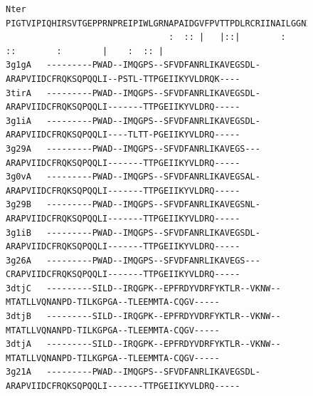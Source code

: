 \documentclass[preprint,12pt]{elsarticle}
\begin{document}
\begin{figure}
\centering
\begin{tiny}
\begin{Verbatim}[frame=single]
Nter    PIGTVIPIQHIRSVTGEPPRNPREIPIWLGRNAPAIDGVFPVTTPDLRCRIINAILGGNIGLSLTPGDCLTWDSAVATLFIRTHGTFP
                                :  :: |   |::|        :    ::        :        |    :  :: |      
3g1gA   ---------PWAD--IMQGPS--SFVDFANRLIKAVEGSDL-ARAPVIIDCFRQKSQPQQLI--PSTL-TTPGEIIKYVLDRQK----
3tirA   ---------PWAD--IMQGPS--SFVDFANRLIKAVEGSDL-ARAPVIIDCFRQKSQPQQLI-------TTPGEIIKYVLDRQ-----
3g1iA   ---------PWAD--IMQGPS--SFVDFANRLIKAVEGSDL-ARAPVIIDCFRQKSQPQQLI----TLTT-PGEIIKYVLDRQ-----
3g29A   ---------PWAD--IMQGPS--SFVDFANRLIKAVEGS---ARAPVIIDCFRQKSQPQQLI-------TTPGEIIKYVLDRQ-----
3g0vA   ---------PWAD--IMQGPS--SFVDFANRLIKAVEGSAL-ARAPVIIDCFRQKSQPQQLI-------TTPGEIIKYVLDRQ-----
3g29B   ---------PWAD--IMQGPS--SFVDFANRLIKAVEGSNL-ARAPVIIDCFRQKSQPQQLI-------TTPGEIIKYVLDRQ-----
3g1iB   ---------PWAD--IMQGPS--SFVDFANRLIKAVEGSDL-ARAPVIIDCFRQKSQPQQLI-------TTPGEIIKYVLDRQ-----
3g26A   ---------PWAD--IMQGPS--SFVDFANRLIKAVEGS---CRAPVIIDCFRQKSQPQQLI-------TTPGEIIKYVLDRQ-----
3dtjC   ---------SILD--IRQGPK--EPFRDYVDRFYKTLR--VKNW--MTATLLVQNANPD-TILKGPGA--TLEEMMTA-CQGV-----
3dtjB   ---------SILD--IRQGPK--EPFRDYVDRFYKTLR--VKNW--MTATLLVQNANPD-TILKGPGA--TLEEMMTA-CQGV-----
3dtjA   ---------SILD--IRQGPK--EPFRDYVDRFYKTLR--VKNW--MTATLLVQNANPD-TILKGPGA--TLEEMMTA-CQGV-----
3g21A   ---------PWAD--IMQGPS--SFVDFANRLIKAVEGSDL-ARAPVIIDCFRQKSQPQQLI-------TTPGEIIKYVLDRQ-----


\end{Verbatim}
\end{tiny}
\end{figure}
\end{document}

